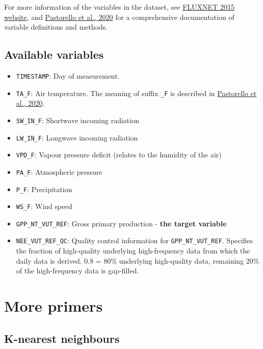 \documentclass[
]{book}
\providecommand{\tightlist}{%
  \setlength{\itemsep}{0pt}\setlength{\parskip}{0pt}}
\begin{document}
For more information of the variables in the dataset, see \href{http://fluxnet.fluxdata.org/data/fluxnet2015-dataset/}{FLUXNET 2015 website}, and \href{https://www.nature.com/articles/s41597-020-0534-3}{Pastorello et al., 2020} for a comprehensive documentation of variable definitions and methods.

\hypertarget{available-variables}{%
\subsection{Available variables}\label{available-variables}}

\begin{itemize}
\tightlist
\item
  \texttt{TIMESTAMP}: Day of measurement.
\item
  \texttt{TA\_F}: Air temperature. The meaning of suffix \texttt{\_F} is described in \href{https://www.nature.com/articles/s41597-020-0534-3}{Pastorello et al., 2020}.
\item
  \texttt{SW\_IN\_F}: Shortwave incoming radiation
\item
  \texttt{LW\_IN\_F}: Longwave incoming radiation
\item
  \texttt{VPD\_F}: Vapour pressure deficit (relates to the humidity of the air)
\item
  \texttt{PA\_F}: Atmospheric pressure
\item
  \texttt{P\_F}: Precipitation
\item
  \texttt{WS\_F}: Wind speed
\item
  \texttt{GPP\_NT\_VUT\_REF}: Gross primary production - \textbf{the target variable}
\item
  \texttt{NEE\_VUT\_REF\_QC}: Quality control information for \texttt{GPP\_NT\_VUT\_REF}. Specifies the fraction of high-quality underlying high-frequency data from which the daily data is derived. 0.8 = 80\% underlying high-quality data, remaining 20\% of the high-frequency data is gap-filled.
\end{itemize}

\hypertarget{more-primers}{%
\section{More primers}\label{more-primers}}

\hypertarget{k-nearest-neighbours}{%
\subsection{K-nearest neighbours}\label{k-nearest-neighbours}}
\end{document}
